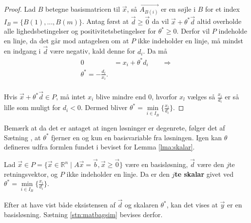 \begin{proof}
Lad $B$ betegne basismatricen til $\vec{x}$, så $\vec{A_{B(i)}}$ er en søjle i $B$ for et index $I_B =\{B(1),...,B(m)\}$. 
Antag først at $\vec{d}\geq \vec{0}$ da vil $\vec{x}+\theta^*\vec{d}$ altid overholde alle lighedsbetingelser og positivitetsbetingelser for $\theta^* \geq 0$. 
Derfor vil $P$ indeholde en linje, da det går mod antagelsen om at $P$ ikke indeholder en linje, må mindst en indgang i $\vec{d}$ være negativ, kald denne for $d_i$.
Da må 
\begin{align*}
 0 &= x_i + \theta^* d_i \qquad \Rightarrow
 \\ \theta^* = -\frac{d_i}{x_i}.
\end{align*} 
\\Hvis $\vec{x} + \theta^* \vec{d} \in P$, må intet $x_i$ blive mindre end $0$, hvorfor $x_l$ vælges så $\frac{x_i}{d_i}$ er så lille som muligt for $d_i < 0$. 
Dermed bliver $\theta^* = \underset{i \in I_B}{\min}\{\frac{x_i}{d_i}\}$. 
\end{proof}
Bemærk at da det er antaget at ingen løsninger er degenrete, følger det af Sætning %
, at $\theta^*$ fjerner en og kun en basisvariable fra løsningen.
Igen kan $\theta$ defineres udfra formlen fundet i beviset for Lemma \ref{lma:skalar}.
\begin{defn}[$j$te skalar]
Lad $\vec{x} \in P =\{\vec{x}\in \mathds{R}^n \mid A\vec{x}= \vec{b}, \vec{x}\geq \vec{0}\}$ være en basisløsning, $\vec{d}$ være den $j$te retningsvektor, og $P$ ikke indeholder en linje.
Da er den \textbf{$j$te skalar} givet ved $\theta^* = \underset{i \in I_B}{\min}\{\frac{x_i}{d_i}\}$.
\end{defn}
Efter at have vist både eksistensen af $\vec{d}$ og skalaren $\theta^*$, kan det vises at $\vec{y}$ er en basisløsning. 
Sætning \ref{stn:matbagsim} bevises derfor.
